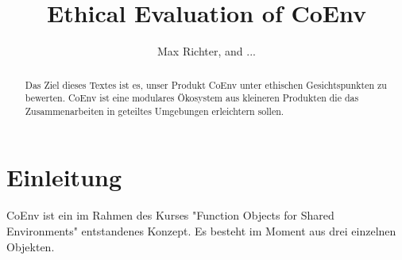 \documentclass{article}
\title{Ethical Evaluation of CoEnv}
\author{Max Richter, and ...}
\begin{document}
\maketitle

\begin{abstract}
  Das Ziel dieses Textes ist es, unser Produkt CoEnv unter ethischen Gesichtspunkten zu bewerten. CoEnv ist eine modulares Ökosystem aus kleineren Produkten die das Zusammenarbeiten in geteiltes Umgebungen erleichtern sollen.
\end{abstract}

\section{Einleitung}

CoEnv ist ein im Rahmen des Kurses "Function Objects for Shared Environments" entstandenes Konzept. Es besteht im Moment aus drei einzelnen Objekten.
\end{document}
